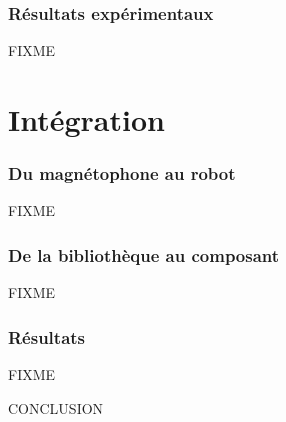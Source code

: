 \documentclass[14pt,utf8x,hyperref={pdfpagelabels=false}]{beamer}
\begin{document}
\begin{frame}
  \frametitle{Résultats expérimentaux}

  FIXME
\end{frame}


\section{Intégration}

\begin{frame}
  \frametitle{Du magnétophone au robot}

  FIXME
\end{frame}

\begin{frame}
  \frametitle{De la bibliothèque au composant}

  FIXME
\end{frame}

\begin{frame}
  \frametitle{Résultats}
  FIXME
\end{frame}


\begin{frame}
  CONCLUSION
\end{frame}

\end{document}
